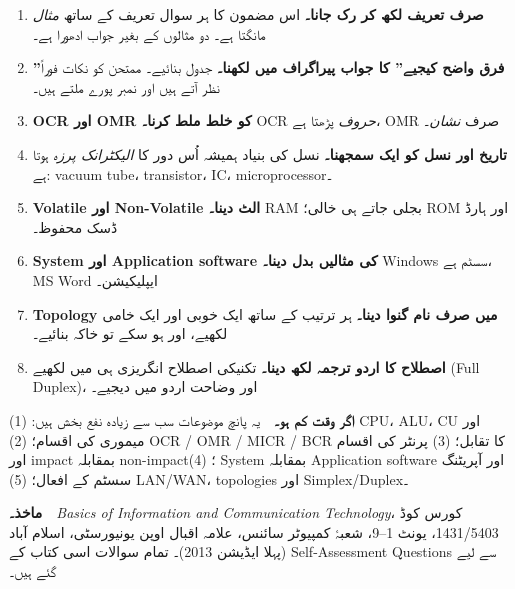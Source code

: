 \begin{enumerate}\setlength{\itemsep}{5pt}
  \item \textbf{صرف تعریف لکھ کر رک جانا۔} اس مضمون کا ہر سوال تعریف کے ساتھ
        \emph{مثال} مانگتا ہے۔ دو مثالوں کے بغیر جواب ادھورا ہے۔
  \item \textbf{''فرق واضح کیجیے'' کا جواب پیراگراف میں لکھنا۔} جدول بنائیے۔
        ممتحن کو نکات فوراً نظر آتے ہیں اور نمبر پورے ملتے ہیں۔
  \item \textbf{\textenglish{OCR} اور \textenglish{OMR} کو خلط ملط کرنا۔}
        \textenglish{OCR} \emph{حروف} پڑھتا ہے، \textenglish{OMR} صرف
        \emph{نشان}۔
  \item \textbf{تاریخ اور نسل کو ایک سمجھنا۔} نسل کی بنیاد ہمیشہ اُس دور کا
        \emph{الیکٹرانک پرزہ} ہوتا ہے: \textenglish{vacuum tube}،
        \textenglish{transistor}، \textenglish{IC}، \textenglish{microprocessor}۔
  \item \textbf{\textenglish{Volatile} اور \textenglish{Non-Volatile} الٹ
        دینا۔} \textenglish{RAM} بجلی جاتے ہی خالی؛ \textenglish{ROM} اور ہارڈ
        ڈسک محفوظ۔
  \item \textbf{\textenglish{System} اور \textenglish{Application software} کی
        مثالیں بدل دینا۔} \textenglish{Windows} سسٹم ہے،
        \textenglish{MS Word} ایپلیکیشن۔
  \item \textbf{\textenglish{Topology} میں صرف نام گنوا دینا۔} ہر ترتیب کے ساتھ
        ایک خوبی اور ایک خامی لکھیے، اور ہو سکے تو خاکہ بنائیے۔
  \item \textbf{اصطلاح کا اردو ترجمہ لکھ دینا۔} تکنیکی اصطلاح انگریزی ہی میں
        لکھیے (\textenglish{Full Duplex})، اور وضاحت اردو میں دیجیے۔
\end{enumerate}

\vfill
\begin{center}
\begin{tcolorbox}[enhanced, colback=white, colframe=bmblue, boxrule=0.5pt,
                  arc=3pt, width=0.94\linewidth,
                  left=11pt, right=11pt, top=9pt, bottom=9pt]
\small
\textbf{\color{bmblue}اگر وقت کم ہو۔}\ \
یہ پانچ موضوعات سب سے زیادہ نفع بخش ہیں:
\textenglish{(1)} \textenglish{CPU}، \textenglish{ALU}، \textenglish{CU} اور
میموری کی اقسام؛
\textenglish{(2)} \textenglish{OCR / OMR / MICR / BCR} کا تقابل؛
\textenglish{(3)} پرنٹر کی اقسام اور \textenglish{impact} بمقابلہ
\textenglish{non-impact}؛
\textenglish{(4)} \textenglish{System} بمقابلہ \textenglish{Application
software} اور آپریٹنگ سسٹم کے افعال؛
\textenglish{(5)} \textenglish{LAN/WAN}، \textenglish{topologies} اور
\textenglish{Simplex/Duplex}۔

\medskip
\textbf{\color{bmblue}ماخذ۔}\ \
\textenglish{\emph{Basics of Information and Communication Technology}}،
کورس کوڈ \textenglish{1431/5403}، یونٹ \textenglish{1--9}، شعبۂ کمپیوٹر سائنس،
علامہ اقبال اوپن یونیورسٹی، اسلام آباد (پہلا ایڈیشن \textenglish{2013})۔ تمام
سوالات اسی کتاب کے \textenglish{Self-Assessment Questions} سے لیے گئے ہیں۔
\end{tcolorbox}
\end{center}
